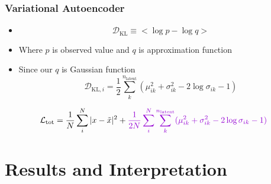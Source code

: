 \documentclass{beamer}
\begin{document}
\begin{frame}
\frametitle{Variational Autoencoder}
\begin{theorem}
\begin{itemize}
    \small 
    \item {}
    \begin{equation}
        \mathcal{D}_{\text{KL}} \equiv < \log p - \log q >
    \end{equation}
    \item Where $p$ is observed value and $q$ is approximation function
    \item Since our $q$ is Gaussian function
    \begin{equation}
        \mathcal{D}_{\text{KL}, i} = \frac{1}{2}\sum_k^{n_{\text{latent}}}(\mu_{ik}^2 +\sigma_{ik}^2 - 2\log\sigma_{ik} - 1)
    \end{equation}
\end{itemize}
\end{theorem}
\begin{equation}
    \mathcal{L}_{\text{tot}} = \frac{1}{N}\sum_i^N |x-\tilde{x}|^2 + \textcolor[RGB]{148,0,211}{\frac{1}{2N}\sum_i^N\sum_k^{n_{\text{latent}}}(\mu_{ik}^2 +\sigma_{ik}^2 - 2\log\sigma_{ik} - 1)}
\end{equation}
\end{frame}

\section{Results and Interpretation}
\subsection{}
\end{document}
